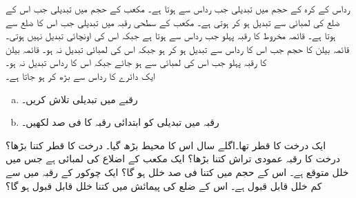 رداس  کے کرہ کے حجم  میں تبدیلی جب رداس  سے  ہوتا ہے۔
مکعب کے حجم  میں تبدیلی جب اس کے ضلع کی لمبائی  سے تبدیل ہو کر  ہوتی ہے۔
مکعب کے سطحی رقبہ میں تبدیلی جب اس کا ضلع  سے  ہوتا ہے۔ 
قائمہ مخروط کا رقبہ پہلو  جب رداس  سے  ہوتا ہے جبکہ اس کی اونچائی  تبدیل نہیں ہوتی۔
قائمہ بیلن کا حجم جب اس کا رداس  سے تبدیل ہو کر  ہو جبکہ اس کی لمبائی  تبدیل نہ ہو۔
قائمہ بیلن کا رقبہ پہلو  جب اس کی لمبائی  سے  ہو جائے جبکہ اس کا رداس تبدیل نہ ہو۔ 
\\
ایک دائرے کا رداس  سے بڑھ کر  ہو جاتا ہے۔
\begin{enumerate}[a.]
\item
رقبے میں تبدیلی تلاش کریں۔
\item
رقبہ میں تبدیلی کو ابتدائی رقبہ کا  فی صد   لکھیں۔
\end{enumerate}
ایک درخت کا قطر  تھا۔اگلے سال اس کا محیط  بڑھ گیا۔ درخت کا قطر کتنا بڑھا؟ درخت کا رقبہ عمودی تراش کتنا بڑھا؟
ایک مکعب کے اضلاع کی لمبائی  ہے جس میں  خلل متوقع ہے۔ اس کے حجم میں کتنا فی صد خلل ہو گا؟
ایک چوکور کے رقبہ میں  سے کم  خلل قابل قبول ہے۔ اس کے ضلع کی پیمائش میں کتنا خلل قابل قبول ہو گا؟
